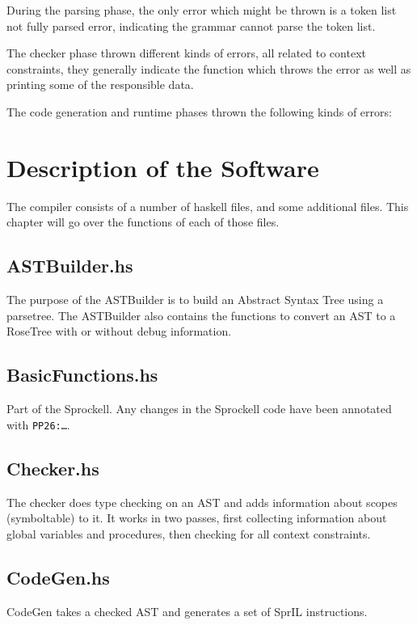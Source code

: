 \documentclass[twoside]{report}
\begin{document}
During the parsing phase, the only error which might be thrown is a token list not fully parsed error, indicating the grammar cannot parse the token list.

The checker phase thrown different kinds of errors, all related to context constraints, they generally indicate the function which throws the error as well as printing some of the responsible data.

The code generation and runtime phases thrown the following kinds of errors:

\chapter{Description of the Software}
\label{description_of_the_software}
The compiler consists of a number of haskell files, and some additional files. This chapter will go over the functions of each of those files.

\section{ASTBuilder.hs}
The purpose of the ASTBuilder is to build an Abstract Syntax Tree using a parsetree. The ASTBuilder also contains the functions to convert an AST to a RoseTree with or without debug information.

\section{BasicFunctions.hs}
Part of the Sprockell. Any changes in the Sprockell code have been annotated with \texttt{PP26:\ldots}.

\section{Checker.hs}
The checker does type checking on an AST and adds information about scopes (symboltable) to it. It works in two passes, first collecting information about global variables and procedures, then checking for all context constraints.

\section{CodeGen.hs}
CodeGen takes a checked AST and generates a set of SprIL instructions. %
\end{document}
